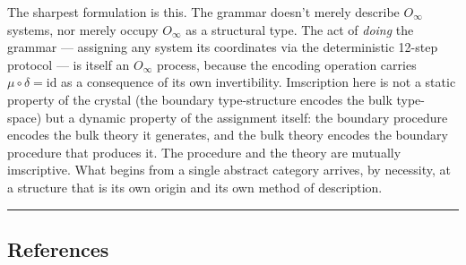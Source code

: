\documentclass[12pt,a4paper]{article}
\begin{document}
The sharpest formulation is this. The grammar doesn't merely describe $O_\infty$ systems, nor merely occupy $O_\infty$ as a structural type. The act of \emph{doing} the grammar --- assigning any system its coordinates via the deterministic 12-step protocol --- is itself an $O_\infty$ process, because the encoding operation carries $\mu \circ \delta = \text{id}$ as a consequence of its own invertibility. Imscription here is not a static property of the crystal (the boundary type-structure encodes the bulk type-space) but a dynamic property of the assignment itself: the boundary procedure encodes the bulk theory it generates, and the bulk theory encodes the boundary procedure that produces it. The procedure and the theory are mutually imscriptive. What begins from a single abstract category arrives, by necessity, at a structure that is its own origin and its own method of description.

\begin{center}
\rule{0.5\textwidth}{0.4pt}
\end{center}

\subsection{References}
\end{document}
